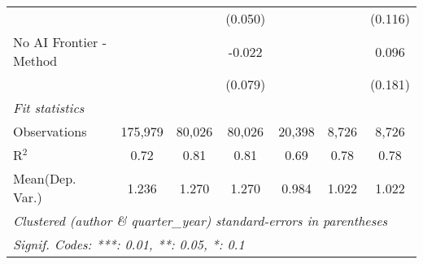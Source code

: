 \begin{tabular}{lcccccc}
                           &                &                & (0.050)        &                &               & (0.116)\\   
   No AI Frontier - Method &                &                & -0.022         &                &               & 0.096\\   
                           &                &                & (0.079)        &                &               & (0.181)\\   
   \midrule
   \emph{Fit statistics}\\
   Observations            & 175,979        & 80,026         & 80,026         & 20,398         & 8,726         & 8,726\\  
   R$^2$                   & 0.72           & 0.81           & 0.81           & 0.69           & 0.78          & 0.78\\  
Mean(Dep. Var.) & 1.236 & 1.270 & 1.270 & 0.984 & 1.022 & 1.022 \\
   \midrule \midrule
   \multicolumn{7}{l}{\emph{Clustered (author \& quarter\_year) standard-errors in parentheses}}\\
   \multicolumn{7}{l}{\emph{Signif. Codes: ***: 0.01, **: 0.05, *: 0.1}}\\
\end{tabular}
\par\endgroup

